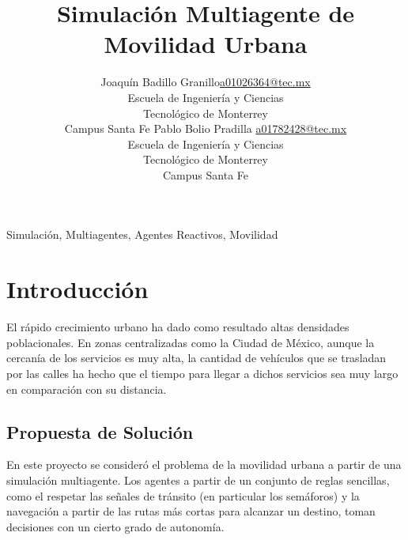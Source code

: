 \documentclass[twoside,11pt]{article}
\newcommand{\myname}{Joaquín Badillo Granillo}
\begin{document}
\renewcommand{\tablename}{Tabla}

\title{Simulación Multiagente de Movilidad Urbana}

\author{\name \myname \email \href{mailto:a01026364@tec.mx}{a01026364@tec.mx} \\
       \addr Escuela de Ingeniería y Ciencias\\
       Tecnológico de Monterrey\\
       Campus Santa Fe
       \AND
       \name Pablo Bolio Pradilla \email \href{mailto:a01782428@tec.mx}{a01782428@tec.mx} \\
       \addr Escuela de Ingeniería y Ciencias\\
       Tecnológico de Monterrey\\
       Campus Santa Fe
       }

\maketitle

\begin{abstract}
    
\end{abstract}

\begin{keywords}
  Simulación, Multiagentes, Agentes Reactivos, Movilidad
\end{keywords}

\section{Introducción}
El rápido crecimiento urbano ha dado como resultado altas densidades poblacionales.
En zonas centralizadas como la Ciudad de México, aunque la cercanía de los servicios
es muy alta, la cantidad de vehículos que se trasladan por las calles ha hecho que
el tiempo para llegar a dichos servicios sea muy largo en comparación con su distancia.

\subsection{Propuesta de Solución}
En este proyecto se consideró el problema de la movilidad urbana a partir de una simulación
multiagente. Los agentes a partir de un conjunto de reglas sencillas, como el respetar las señales
de tránsito (en particular los semáforos) y la navegación a partir de las rutas más cortas para 
alcanzar un destino, toman decisiones con un cierto grado de autonomía.
\end{document}
